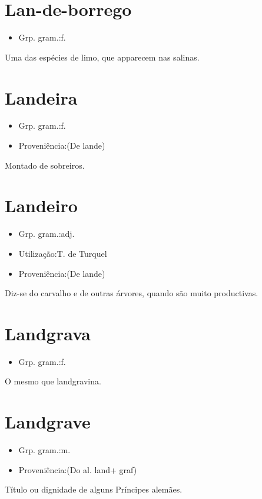 \section{Lan-de-borrego}
\begin{itemize}
\item {Grp. gram.:f.}
\end{itemize}
Uma das espécies de limo, que apparecem nas salinas.
\section{Landeira}
\begin{itemize}
\item {Grp. gram.:f.}
\end{itemize}
\begin{itemize}
\item {Proveniência:(De \textunderscore lande\textunderscore )}
\end{itemize}
Montado de sobreiros.
\section{Landeiro}
\begin{itemize}
\item {Grp. gram.:adj.}
\end{itemize}
\begin{itemize}
\item {Utilização:T. de Turquel}
\end{itemize}
\begin{itemize}
\item {Proveniência:(De \textunderscore lande\textunderscore )}
\end{itemize}
Diz-se do carvalho e de outras árvores, quando são muito productivas.
\section{Landgrava}
\begin{itemize}
\item {Grp. gram.:f.}
\end{itemize}
O mesmo que \textunderscore landgravina\textunderscore .
\section{Landgrave}
\begin{itemize}
\item {Grp. gram.:m.}
\end{itemize}
\begin{itemize}
\item {Proveniência:(Do al. \textunderscore land\textunderscore  + \textunderscore graf\textunderscore )}
\end{itemize}
Título ou dignidade de alguns Príncipes alemães.
